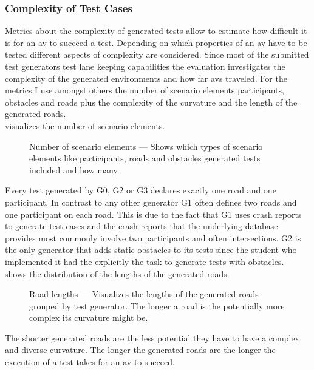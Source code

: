 \subsubsection{Complexity of Test Cases}
Metrics about the complexity of generated tests allow to estimate how difficult it is for an \gls{av} to succeed a test.
Depending on which properties of an \gls{av} have to be tested different aspects of complexity are considered.
Since most of the submitted test generators test lane keeping capabilities the evaluation investigates the complexity of the generated environments and how far \glspl{av} traveled.
For the metrics I use amongst others the number of scenario elements \ie{} participants, obstacles and roads plus the complexity of the curvature and the length of the generated roads.\\
 visualizes the number of scenario elements.
\begin{figure}
    
    
    
    \medskip
    \caption{%
        Number of scenario elements --- Shows which types of scenario elements like participants, roads and obstacles generated tests included and how many.
    }\label{fig:numElements}
\end{figure}
Every test generated by G0, G2 or G3 declares exactly one road and one participant.
In contrast to any other generator G1 often defines two roads and one participant on each road.
This is due to the fact that G1 uses crash reports to generate test cases and the crash reports that the underlying database provides most commonly involve two participants and often intersections.
G2 is the only generator that adds static obstacles to its tests since the student who implemented it had the explicitly the task to generate tests with obstacles.\\
 shows the distribution of the lengths of the generated roads.
\begin{figure}
    
    \medskip
    \caption{%
        Road lengths --- Visualizes the lengths of the generated roads grouped by test generator.
        The longer a road is the potentially more complex its curvature might be.
    }\label{fig:roadLengths}
\end{figure}
The shorter generated roads are the less potential they have to have a complex and diverse curvature.
The longer the generated roads are the longer the execution of a test takes for an \gls{av} to succeed.
